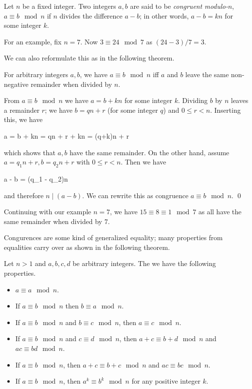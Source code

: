 
\begin{definition}
    Let $n$ be a fixed integer. Two integers $a, b$ are said to be \emph{congruent modulo-$n$}, $a \equiv b \mod n$ if $n$ divides the difference $a - b$; in other words, $a - b = kn$ for some integer $k$.
\end{definition}

For an example, fix $n = 7$. Now $3 \equiv 24 \mod 7$ as $(24-3) / 7 = 3$.

We can also reformulate this as in the following theorem.

\begin{theorem}
    For arbitrary integers $a, b$, we have $a \equiv b \mod n$ iff $a$ and $b$ leave the same non-negative remainder when divided by $n$.
\end{theorem}

From $a \equiv b \mod n$ we have $a = b + kn$ for some integer $k$. Dividing $b$ by $n$ leaves a remainder $r$; we have $b = qn + r$ (for some integer $q$) and $0 \leq r < n$. Inserting this, we have

\bee
a = b + kn = qn + r + kn = (q+k)n + r
\eee

which shows that $a, b$ have the same remainder. On the other hand, assume $a = q_1 n + r, b = q_2 n + r$ with $0 \leq r < n$. Then we have

\bee
a - b = (q_1 - q_2)n
\eee

and therefore $n \mid (a-b)$. We can rewrite this as congruence $a \equiv b \mod n$. \qed

Continuing with our example $n = 7$, we have $15 \equiv 8 \equiv 1 \mod 7$ as all have the same remainder when divided by $7$.

Congurences are some kind of generalized equality; many properties from equalities carry over as shown in the following theorem.

\begin{theorem}
    Let $n > 1$ and $a, b, c, d$ be arbitrary integers. The we have the following properties.

    \begin{itemize}
        \item $a \equiv a \mod n$.
        \item If $a \equiv b \mod n$ then $b \equiv a \mod n$.
        \item If $a \equiv b \mod n$ and $b \equiv c \mod n$, then $a \equiv c \mod n$.
        \item If $a \equiv b \mod n$ and $c \equiv d \mod n$, then $a+c \equiv b+d \mod n$ and $ac \equiv bd \mod n$.
        \item If $a \equiv b \mod n$, then $a+c \equiv b+c \mod n$ and $ac \equiv bc \mod n$.
        \item If $a \equiv b \mod n$, then $a^k \equiv b^k \mod n$ for any positive integer $k$.
    \end{itemize}

\end{theorem}



